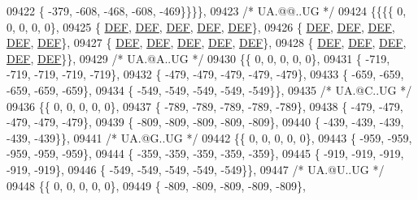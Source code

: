 \begin{DoxyCode}
09422 \{ -379, -608, -468, -608, -469\}\}\}\},
09423 \textcolor{comment}{/* UA.@@..UG */}
09424 \{\{\{\{    0,    0,    0,    0,    0\},
09425 \{  \mbox{\hyperlink{1_88_84__epars_8h_a397419fc12b37ed479c8abb9d444d843}{DEF}},  \mbox{\hyperlink{1_88_84__epars_8h_a397419fc12b37ed479c8abb9d444d843}{DEF}},  \mbox{\hyperlink{1_88_84__epars_8h_a397419fc12b37ed479c8abb9d444d843}{DEF}},  \mbox{\hyperlink{1_88_84__epars_8h_a397419fc12b37ed479c8abb9d444d843}{DEF}},  \mbox{\hyperlink{1_88_84__epars_8h_a397419fc12b37ed479c8abb9d444d843}{DEF}}\},
09426 \{  \mbox{\hyperlink{1_88_84__epars_8h_a397419fc12b37ed479c8abb9d444d843}{DEF}},  \mbox{\hyperlink{1_88_84__epars_8h_a397419fc12b37ed479c8abb9d444d843}{DEF}},  \mbox{\hyperlink{1_88_84__epars_8h_a397419fc12b37ed479c8abb9d444d843}{DEF}},  \mbox{\hyperlink{1_88_84__epars_8h_a397419fc12b37ed479c8abb9d444d843}{DEF}},  \mbox{\hyperlink{1_88_84__epars_8h_a397419fc12b37ed479c8abb9d444d843}{DEF}}\},
09427 \{  \mbox{\hyperlink{1_88_84__epars_8h_a397419fc12b37ed479c8abb9d444d843}{DEF}},  \mbox{\hyperlink{1_88_84__epars_8h_a397419fc12b37ed479c8abb9d444d843}{DEF}},  \mbox{\hyperlink{1_88_84__epars_8h_a397419fc12b37ed479c8abb9d444d843}{DEF}},  \mbox{\hyperlink{1_88_84__epars_8h_a397419fc12b37ed479c8abb9d444d843}{DEF}},  \mbox{\hyperlink{1_88_84__epars_8h_a397419fc12b37ed479c8abb9d444d843}{DEF}}\},
09428 \{  \mbox{\hyperlink{1_88_84__epars_8h_a397419fc12b37ed479c8abb9d444d843}{DEF}},  \mbox{\hyperlink{1_88_84__epars_8h_a397419fc12b37ed479c8abb9d444d843}{DEF}},  \mbox{\hyperlink{1_88_84__epars_8h_a397419fc12b37ed479c8abb9d444d843}{DEF}},  \mbox{\hyperlink{1_88_84__epars_8h_a397419fc12b37ed479c8abb9d444d843}{DEF}},  \mbox{\hyperlink{1_88_84__epars_8h_a397419fc12b37ed479c8abb9d444d843}{DEF}}\}\},
09429 \textcolor{comment}{/* UA.@A..UG */}
09430 \{\{    0,    0,    0,    0,    0\},
09431 \{ -719, -719, -719, -719, -719\},
09432 \{ -479, -479, -479, -479, -479\},
09433 \{ -659, -659, -659, -659, -659\},
09434 \{ -549, -549, -549, -549, -549\}\},
09435 \textcolor{comment}{/* UA.@C..UG */}
09436 \{\{    0,    0,    0,    0,    0\},
09437 \{ -789, -789, -789, -789, -789\},
09438 \{ -479, -479, -479, -479, -479\},
09439 \{ -809, -809, -809, -809, -809\},
09440 \{ -439, -439, -439, -439, -439\}\},
09441 \textcolor{comment}{/* UA.@G..UG */}
09442 \{\{    0,    0,    0,    0,    0\},
09443 \{ -959, -959, -959, -959, -959\},
09444 \{ -359, -359, -359, -359, -359\},
09445 \{ -919, -919, -919, -919, -919\},
09446 \{ -549, -549, -549, -549, -549\}\},
09447 \textcolor{comment}{/* UA.@U..UG */}
09448 \{\{    0,    0,    0,    0,    0\},
09449 \{ -809, -809, -809, -809, -809\},

\end{DoxyCode}
